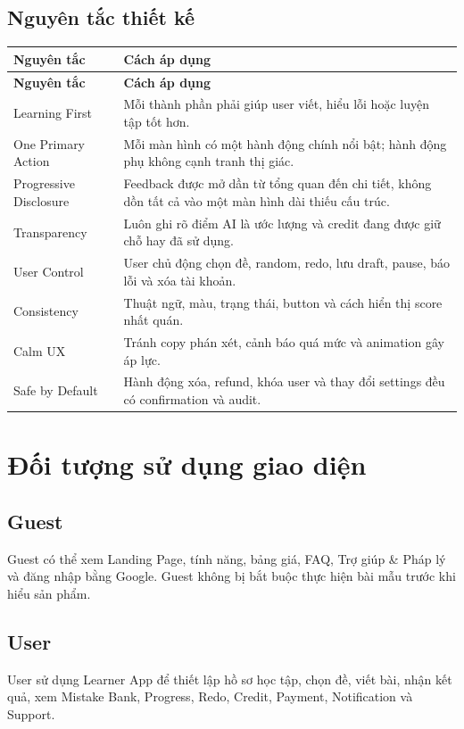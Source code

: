 \documentclass[11pt,a4paper]{article}
\begin{document}
\subsection{Nguyên tắc thiết kế}
\begin{longtable}{|P{0.23\textwidth}|P{0.65\textwidth}|}
\hline
\textbf{Nguyên tắc} & \textbf{Cách áp dụng} \\ \hline
\endfirsthead
\hline
\textbf{Nguyên tắc} & \textbf{Cách áp dụng} \\ \hline
\endhead
Learning First & Mỗi thành phần phải giúp user viết, hiểu lỗi hoặc luyện tập tốt hơn. \\ \hline
One Primary Action & Mỗi màn hình có một hành động chính nổi bật; hành động phụ không cạnh tranh thị giác. \\ \hline
Progressive Disclosure & Feedback được mở dần từ tổng quan đến chi tiết, không dồn tất cả vào một màn hình dài thiếu cấu trúc. \\ \hline
Transparency & Luôn ghi rõ điểm AI là ước lượng và credit đang được giữ chỗ hay đã sử dụng. \\ \hline
User Control & User chủ động chọn đề, random, redo, lưu draft, pause, báo lỗi và xóa tài khoản. \\ \hline
Consistency & Thuật ngữ, màu, trạng thái, button và cách hiển thị score nhất quán. \\ \hline
Calm UX & Tránh copy phán xét, cảnh báo quá mức và animation gây áp lực. \\ \hline
Safe by Default & Hành động xóa, refund, khóa user và thay đổi settings đều có confirmation và audit. \\ \hline
\end{longtable}

\section{Đối tượng sử dụng giao diện}

\subsection{Guest}
Guest có thể xem Landing Page, tính năng, bảng giá, FAQ, Trợ giúp \& Pháp lý và đăng nhập bằng Google. Guest không bị bắt buộc thực hiện bài mẫu trước khi hiểu sản phẩm.

\subsection{User}
User sử dụng Learner App để thiết lập hồ sơ học tập, chọn đề, viết bài, nhận kết quả, xem Mistake Bank, Progress, Redo, Credit, Payment, Notification và Support.
\end{document}

